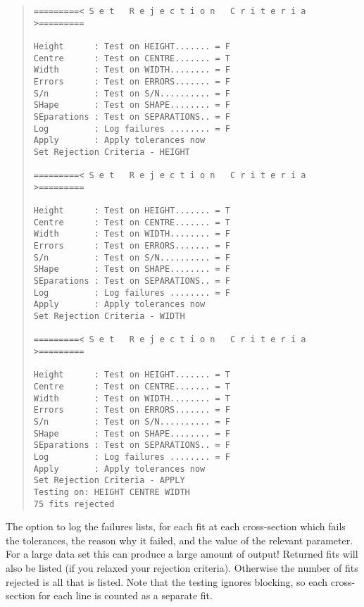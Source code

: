 \begin{quote}
\begin{verbatim}
=========< S e t   R e j e c t i o n   C r i t e r i a >=========

Height      : Test on HEIGHT....... = F
Centre      : Test on CENTRE....... = T
Width       : Test on WIDTH........ = F
Errors      : Test on ERRORS....... = F
S/n         : Test on S/N.......... = F
SHape       : Test on SHAPE........ = F
SEparations : Test on SEPARATIONS.. = F
Log         : Log failures ........ = F
Apply       : Apply tolerances now
Set Rejection Criteria - HEIGHT

=========< S e t   R e j e c t i o n   C r i t e r i a >=========

Height      : Test on HEIGHT....... = T
Centre      : Test on CENTRE....... = T
Width       : Test on WIDTH........ = F
Errors      : Test on ERRORS....... = F
S/n         : Test on S/N.......... = F
SHape       : Test on SHAPE........ = F
SEparations : Test on SEPARATIONS.. = F
Log         : Log failures ........ = F
Apply       : Apply tolerances now
Set Rejection Criteria - WIDTH

=========< S e t   R e j e c t i o n   C r i t e r i a >=========

Height      : Test on HEIGHT....... = T
Centre      : Test on CENTRE....... = T
Width       : Test on WIDTH........ = T
Errors      : Test on ERRORS....... = F
S/n         : Test on S/N.......... = F
SHape       : Test on SHAPE........ = F
SEparations : Test on SEPARATIONS.. = F
Log         : Log failures ........ = F
Apply       : Apply tolerances now
Set Rejection Criteria - APPLY
Testing on: HEIGHT CENTRE WIDTH
75 fits rejected
\end{verbatim}\end{quote}
The option to log the failures lists, for each fit at each
cross-section which fails the tolerances, the reason why it failed, and
the value of the relevant parameter.
For a large data set this can produce a large amount of output!
Returned fits will also be listed (if you relaxed your rejection
criteria).
Otherwise the number of fits rejected is all that is listed.
Note that the testing ignores blocking, so each cross-section for each
line is counted as a separate fit.

